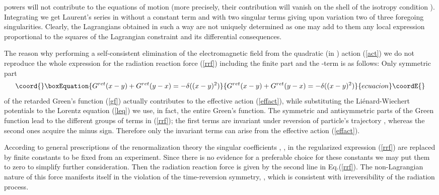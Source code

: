 \documentclass[a4paper,12pt]{article}
\begin{document}
powers will not contribute to the equations of motion \coordHE{} (more precisely, their contribution will
vanish on the shell of the isotropy condition \coordHE{}). Integrating we get Laurent's series in
\coordHE{} without a constant term and with two singular terms
giving upon variation two of three foregoing singularities.
Clearly, the Lagrangians obtained in such a way are not uniquely
determined as one may add to them any local expression
proportional to the squares of the Lagrangian constraint \coordHE{} and its differential consequences.

The reason why performing a self-consistent elimination of the
electromagnetic field from the quadratic (in \coordHE{}) action
(\ref{act}) we do not reproduce the whole expression for the
radiation reaction force (\ref{rrf}) including the finite part
and the \coordHE{}-term is as follows: Only symmetric part
\begin{equation}\coord{}\boxEquation{\label{}
G^{ret}(x-y)+G^{ret}(y-x)=-\delta((x-y)^2)
}{G^{ret}(x-y)+G^{ret}(y-x)=-\delta((x-y)^2)
}{ecuacion}\coordE{}\end{equation}
of the retarded Green's function (\ref{gf}) actually contributes
to the effective action (\ref{effact}), while substituting the
Li\'enard-Wiechert potentials to the Lorentz equation (\ref{leq})
we use, in fact, the entire Green's function. The symmetric and
antisymmetric parts of the Green function lead to the different
groups of terms in (\ref{rrf}); the first terms are invariant
under reversion of particle's trajectory \myHighlight{$\tau\rightarrow -\tau$}\coordHE{},
whereas the second ones acquire the minus sign. Therefore only
the invariant terms can arise from the effective action
(\ref{effact}).

According  to general prescriptions of the renormalization theory
the singular coefficients \coordHE{}, \coordHE{}, \coordHE{} in
the regularized expression (\ref{rrf}) are replaced by finite
constants to be fixed from an experiment. Since there is no
evidence for a preferable choice for these constants we may put
them to zero to simplify further consideration. Then the
radiation reaction force \coordHE{} is given by the second line
in Eq.(\ref{rrf}). The non-Lagrangian nature of this force
manifests itself in the violation of the time-reversion symmetry,
\myHighlight{$\tau \rightarrow -\tau$}\coordHE{}, which is consistent with
irreversibility of the radiation process.
\end{document}
